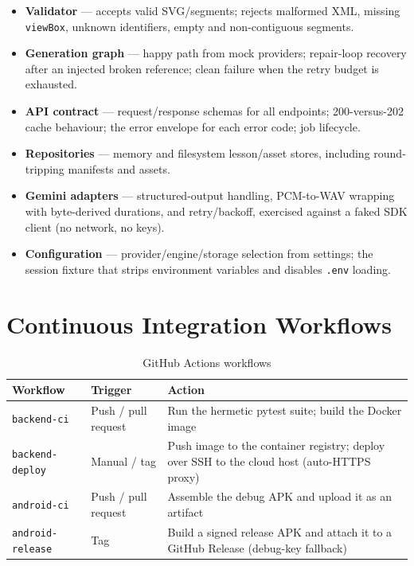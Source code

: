 \begin{itemize}
  \item \textbf{Validator} --- accepts valid SVG/segments; rejects malformed
        XML, missing \texttt{viewBox}, unknown identifiers, empty and
        non-contiguous segments.
  \item \textbf{Generation graph} --- happy path from mock providers;
        repair-loop recovery after an injected broken reference; clean
        failure when the retry budget is exhausted.
  \item \textbf{API contract} --- request/response schemas for all
        endpoints; 200-versus-202 cache behaviour; the error envelope for
        each error code; job lifecycle.
  \item \textbf{Repositories} --- memory and filesystem lesson/asset stores,
        including round-tripping manifests and assets.
  \item \textbf{Gemini adapters} --- structured-output handling, PCM-to-WAV
        wrapping with byte-derived durations, and retry/backoff, exercised
        against a faked SDK client (no network, no keys).
  \item \textbf{Configuration} --- provider/engine/storage selection from
        settings; the session fixture that strips environment variables and
        disables \texttt{.env} loading.
\end{itemize}

\section{Continuous Integration Workflows}

\begin{table}[htbp]
\caption{GitHub Actions workflows}
\label{tab:ci}
\centering
\small
\renewcommand{\arraystretch}{1.3}
\begin{tabular}{@{}lp{}p{}@{}}
\toprule
\textbf{Workflow} & \textbf{Trigger} & \textbf{Action}\\
\midrule
\texttt{backend-ci} & Push / pull request & Run the hermetic pytest suite;
build the Docker image\\
\texttt{backend-deploy} & Manual / tag & Push image to the container
registry; deploy over SSH to the cloud host (auto-HTTPS proxy)\\
\texttt{android-ci} & Push / pull request & Assemble the debug APK and
upload it as an artifact\\
\texttt{android-release} & Tag & Build a signed release APK and attach it to
a GitHub Release (debug-key fallback)\\
\bottomrule
\end{tabular}
\end{table}
